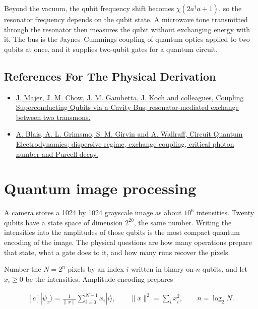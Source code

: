 \documentclass[11pt,oneside]{book}
\newenvironment{centeredalign}{\[\begin{gathered}[c]}{\end{gathered}\]}
\begin{document}
Beyond the vacuum, the qubit frequency shift becomes \(\chi(2a^\dagger a+1)\), so the resonator frequency depends on the qubit state. A microwave tone transmitted through the resonator then measures the qubit without exchanging energy with it. The bus is the Jaynes--Cummings coupling of quantum optics applied to two qubits at once, and it supplies two-qubit gates for a quantum circuit.

\subsection*{References For The Physical Derivation}
\begin{itemize}
\item \href{https://arxiv.org/abs/0709.2135}{J. Majer, J. M. Chow, J. M. Gambetta, J. Koch and colleagues, Coupling Superconducting Qubits via a Cavity Bus; resonator-mediated exchange between two transmons.}
\item \href{https://arxiv.org/abs/2005.12667}{A. Blais, A. L. Grimsmo, S. M. Girvin and A. Wallraff, Circuit Quantum Electrodynamics; dispersive regime, exchange coupling, critical photon number and Purcell decay.}
\end{itemize}





\clearpage

\section{Quantum image processing}

\label{topic:quantum-image-processing}

A camera stores a 1024 by 1024 grayscale image as about \(10^6\) intensities. Twenty qubits have a state space of dimension \(2^{20}\), the same number. Writing the intensities into the amplitudes of those qubits is the most compact quantum encoding of the image. The physical questions are how many operations prepare that state, what a gate does to it, and how many runs recover the pixels.

Number the \(N=2^n\) pixels by an index \(i\) written in binary on \(n\) qubits, and let \(x_i\geq0\) be the intensities. Amplitude encoding prepares

\begin{centeredalign}
|\psi_x\rangle=\frac{1}{\|x\|}\sum_{i=0}^{N-1}x_i|i\rangle,\qquad
\|x\|^2=\sum_i x_i^2,\qquad n=\log_2N.
\end{centeredalign}
\end{document}
